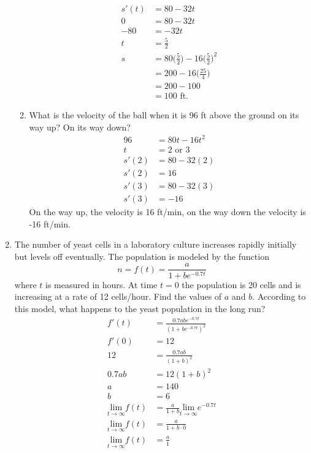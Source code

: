\documentclass{article}
\begin{document}
\begin{enumerate}
\begin{enumerate}
			$$\begin{align}
				s'(t)&=80-32t\\
				0&=80-32t\\
				-80&=-32t\\
				t&=\frac{5}{2}\\
				s&=80\Big(\frac{5}{2}\Big)-16\Big(\frac{5}{2}\Big)^2\\
				&=200-16\Big(\frac{25}{4}\Big)\\
				&=200-100\\
				&=\boxed{100\text{ ft.}}
			\end{align}$$
			\item What is the velocity of the ball when it is 96 ft above the ground on its way up? On its way down?
				$$\begin{align}
					96&=80t-16t^2\\
					t&=2 \text{ or } 3\\
					s'(2)&=80-32(2)\\
					s'(2)&=16\\
					s'(3)&=80-32(3)\\
					s'(3)&=-16
				\end{align}$$
				On the way up, the velocity is 16 ft/min, on the way down the velocity is -16 ft/min.
		\end{enumerate}
\setcounter{enumi}{23}
	\item The number of yeast cells in a laboratory culture increases rapidly initially but levels off eventually. The population is modeled by the function $$n=f(t)=\frac{a}{1+be^{-0.7t}}$$ where $t$ is measured in hours. At time $t=0$ the population is 20 cells and is increasing at a rate of 12 cells/hour. Find the values of $a$ and $b$. According to this model, what happens to the yeast population in the long run?
	$$\begin{align}
		f'(t)&=\frac{0.7abe^{-0.7t}}{(1+be^{-0.7t})^2}\\
		f'(0)&=12\\
		12&=\frac{0.7ab}{(1+b)^2}\\
		0.7ab&=12(1+b)^2\\
		a&=140\\
		b&=6\\
		\underset{t\rightarrow\infty}{\text{lim}}f(t)&=\frac{a}{1+b}\underset{t\rightarrow\infty}{\text{lim}}e^{-0.7t}\\
		\underset{t\rightarrow\infty}{\text{lim}}f(t)&=\frac{a}{1+b\cdot 0}\\
		\underset{t\rightarrow\infty}{\text{lim}}f(t)&=\frac{a}{1}\\

\end{align}$$
\end{enumerate}
\end{document}

